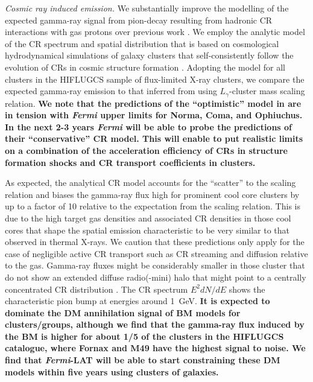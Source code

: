\documentclass[10pt,aps,pra,reprint,amsmath,amsfonts,amssymb,showpacs,nofootinbib,floatfix]{revtex4-1}
\def\del#1{{}}
\def\C#1{{\bf #1}}
\newcommand{\Fermi}{{\em Fermi}\xspace}
\begin{document}
{\em Cosmic ray induced emission.} We substantially improve the
modelling of the expected gamma-ray signal from pion-decay resulting
from hadronic CR interactions with gas protons over previous work
\cite{2010ApJ...717L..71A}. We employ the analytic model of the CR
spectrum and spatial distribution that is based on cosmological
hydrodynamical simulations of galaxy clusters that self-consistently
follow the evolution of CRs in cosmic structure formation
\cite{2010MNRAS.409..449P}. Adopting the model for all clusters in the
HIFLUGCS sample of flux-limited X-ray clusters, we compare the
expected gamma-ray emission to that inferred from using
$L_\gamma$-cluster mass scaling relation. \C{We note that the
  predictions of the ``optimistic'' model in
  \cite{2010MNRAS.409..449P} are in tension with \Fermi upper limits
  for Norma, Coma, and Ophiuchus. In the next 2-3 years \Fermi will be
  able to probe the predictions of their ``conservative'' CR
  model. This will enable to put realistic limits on a combination of
  the acceleration efficiency of CRs in structure formation shocks and
  CR transport coefficients in clusters.}

As expected, the analytical CR model accounts for the ``scatter'' to
the scaling relation and biases the gamma-ray flux high for prominent
cool core clusters by up to a factor of 10 relative to the expectation
from the scaling relation. This is due to the high target gas
densities and associated CR densities in those cool cores that shape
the spatial emission characteristic to be very similar to that
observed in thermal X-rays. We caution that these predictions only
apply for the case of negligible active CR transport such as CR
streaming and diffusion relative to the gas. Gamma-ray fluxes might be
considerably smaller in those cluster that do not show an extended
diffuse radio(-mini) halo that might point to a centrally concentrated
CR distribution \citep{2011A&A...527A..99E}. The CR spectrum $E^2
dN/dE$ shows the characteristic pion bump at energies around
1~GeV. \C{It is expected to dominate the DM annihilation signal of BM
  models for clusters/groups, although we find that the gamma-ray flux
  induced by the BM is higher for about 1/5 of the clusters in the
  HIFLUGCS catalogue, where Fornax and M49 have the highest signal to
  noise. We find that \Fermi-LAT will be able to start constraining
  these DM models within five years using clusters of galaxies.}
\del{It is expected to dominate the DM annihilation signal of BM
  models for all clusters/groups but Fornax.}
\end{document}
